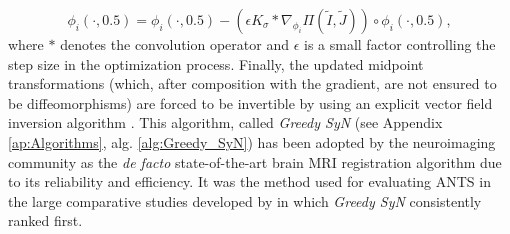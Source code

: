 \begin{equation}\label{eq:gsyn_update}
    \phi_{i}(\cdot, 0.5) = \phi_{i}(\cdot, 0.5) - \left( \epsilon K_{\sigma} \ast \nabla_{\phi_{i}} \Pi(\tilde{I}, \tilde{J}) \right) \circ \phi_{i}(\cdot, 0.5),
\end{equation}
where $\ast$ denotes the convolution operator and $\epsilon$ is a small factor controlling the step size in the optimization process. Finally, the updated midpoint transformations (which, after composition with the gradient, are not ensured to be diffeomorphisms) are forced to be invertible by using an explicit vector field inversion algorithm \citep{Chen2008}. This algorithm, called \textit{Greedy SyN} (see Appendix \ref{ap:Algorithms}, alg. \ref{alg:Greedy_SyN}) has been adopted by the neuroimaging community as the \textit{de facto} state-of-the-art brain MRI registration algorithm due to its reliability and efficiency. It was the method used for evaluating ANTS \citep{Avants2011} in the large comparative studies developed by \cite{Klein2009, Klein2010} in which \textit{Greedy SyN} consistently ranked first.


